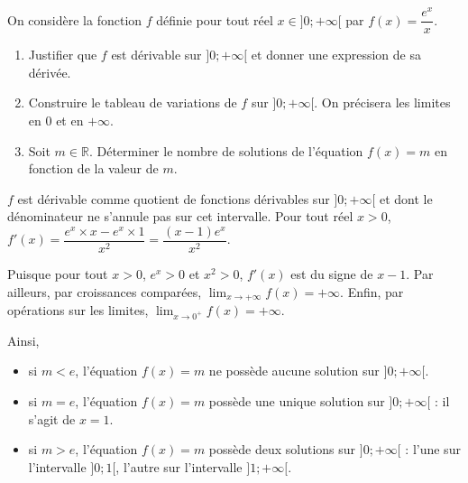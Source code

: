 \documentclass[11pt,fleqn, openany]{book} %
\begin{document}
\begin{exercise}[topic=cont03, subtitle={(Métropole 2021)}]

On considère la fonction $f$ définie pour tout réel $x\in ]0;+\infty[$ par $f(x)=\dfrac{e^x}{x}$. 
\begin{enumerate}
\item Justifier que $f$ est dérivable sur $]0;+\infty[$ et donner une expression de sa dérivée.
\item Construire le tableau de variations de $f$ sur $]0;+\infty[$. On précisera les limites en $0$ et en $+\infty$.
\item Soit $m\in\mathbb{R}$. Déterminer le nombre de solutions de l'équation $f(x)=m$ en fonction de la valeur de $m$.
\end{enumerate}
\end{exercise}

\begin{solution}$f$ est dérivable comme quotient de fonctions dérivables sur $]0;+\infty[$ et dont le dénominateur ne s'annule pas sur cet intervalle. Pour tout réel $x>0$, $f'(x)=\dfrac{e^x \times x - e^x \times 1}{x^2}=\dfrac{(x-1)e^x}{x^2}$.

Puisque pour tout $x>0$, $e^x>0$ et $x^2>0$, $f'(x)$ est du signe de $x-1$. Par ailleurs, par croissances comparées, $\displaystyle\lim_{x\to +\infty}f(x)=+\infty$. Enfin, par opérations sur les limites, $\displaystyle\lim_{x\to 0^+}f(x)=+\infty$.

\begin{center}
\end{center}


Ainsi,
\begin{itemize}
\item si $m<e$, l'équation $f(x)=m$ ne possède aucune solution sur $]0;+\infty[$.
\item si $m=e$, l'équation $f(x)=m$ possède une unique solution sur $]0;+\infty[$ : il s'agit de $x=1$.
\item si $m>e$, l'équation $f(x)=m$ possède deux solutions sur $]0;+\infty[$ : l'une sur l'intervalle $]0;1[$, l'autre sur l'intervalle $]1;+\infty[$.
\end{itemize}
\end{solution}
\end{document}
